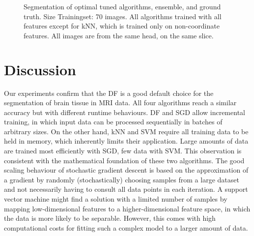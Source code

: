 \documentclass[journal]{IEEEtran}
\begin{document}
\begin{figure}[h!]
	\hfill
	\hfill
	\caption{Segmentation of optimal tuned algorithms, ensemble, and ground truth. Size Trainingset: 70 images. All algorithms trained with all features except for kNN, which is trained only on non-coordinate features. All images are from the same head, on the same slice. }
	\label{f.slices_all}
\end{figure}

\section{Discussion}
Our experiments confirm that the DF is a good default choice for the segmentation of brain tissue in MRI data. All four algorithms reach a similar accuracy but with different runtime behaviours. DF and SGD allow incremental training, in which input data can be processed sequentially in batches of arbitrary sizes. On the other hand, kNN and SVM require all training data to be held in memory, which inherently limits their application. Large amounts of data are trained most efficiently with SGD, few data with SVM. This observation is consistent with the mathematical foundation of these two algorithms. The good scaling behaviour of stochastic gradient descent is based on the approximation of a gradient by randomly (stochastically) choosing samples from a large dataset and not necessarily having to consult all data points in each iteration. A support vector machine might find a solution with a limited number of samples by mapping low-dimensional features to a higher-dimensional feature space, in which the data is more likely to be separable. However, this comes with high computational costs for fitting such a complex model to a larger amount of data.
\end{document}
